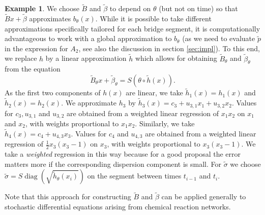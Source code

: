\documentclass[preprint]{imsart}
\renewcommand{\th}{\theta}
\renewcommand{\tilde}{\widetilde}
\theoremstyle{definition}
\newtheorem{ex}[thm]{Example}
\begin{document}
\begin{ex}
We choose $\tilde B$ and $\tilde \beta$ to depend on $\th$ (but not on time) so that $\tilde{B} x + \tilde\beta$  approximates $b_\th(x)$. While it is possible to take different approximations specifically tailored for each bridge segment, it is computationally advantageous to work with a global approximation to $b_\th$ (as we need to evaluate $\tilde p$ in the expression for $A_2$, see also the discussion in section \ref{sec:impl}). To this end, we replace $h$ by a linear approximation $\tilde{h}$ which allows for obtaining $\tilde{B}_\th$ and $\tilde\beta_\th$ from the equation
\[ \tilde{B}_\th x +\tilde\beta_\th = S (\th \circ \tilde{h}(x)). \]
As the first two components of  $h(x)$ are linear, we take $\tilde{h}_1(x)=h_1(x)$ and $\tilde{h}_2(x)=h_2(x)$. We approximate $h_3$ by $\tilde{h}_3(x) = c_3+ u_{3,1} x_1 + u_{3,2} x_2$. Values for $c_3, u_{3,1}$ and $u_{3,2}$ are obtained from a weighted linear regression of $x_1 x_2$ on $x_1$ and $x_2$, with weights proportional to $x_1 x_2$. Similarly, we take $\tilde{h}_4(x)= c_4+ u_{4,3} x_3$.  Values for $c_4$ and $u_{4,3}$ are obtained from a weighted linear regression of $\frac12 x_3(x_3-1)$ on $x_3$, with weights proportional to $x_3(x_3-1)$.
We take a {\it weighted} regression in this way because for a good proposal the error matters more if the corresponding dispersion component is small. 
For $\tilde\sigma$ we choose $\tilde\sigma=S \operatorname{diag}  \left(\sqrt{\tilde{h}_\th(x_i)}\right)$ on the segment between times $t_{i-1}$ and $t_i$. 

Note that this approach for constructing $\tilde{B}$ and $\tilde\beta$ can be applied generally to stochastic differential equations arising from chemical reaction networks.

\end{ex}
\end{document}
